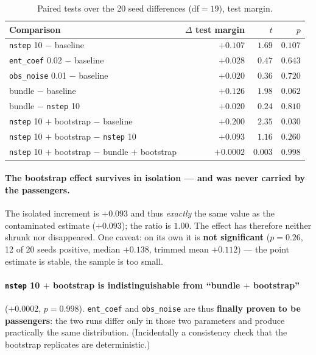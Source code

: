 \begin{table}[H]
  \centering
  \caption{Paired tests over the 20 seed differences (df$=19$), test margin.}
  \label{tab:update-a3c-paired}
  \small
  \begin{tabular}{lrrr}
    \toprule
    Comparison & $\Delta$ test margin & $t$ & $p$\\
    \midrule
    \texttt{nstep} 10 $-$ baseline            & $+0.107$ & $1.69$ & $0.107$\\
    \texttt{ent\_coef} 0.02 $-$ baseline      & $+0.028$ & $0.47$ & $0.643$\\
    \texttt{obs\_noise} 0.01 $-$ baseline     & $+0.020$ & $0.36$ & $0.720$\\
    bundle $-$ baseline                       & $+0.126$ & $1.98$ & $0.062$\\
    bundle $-$ \texttt{nstep} 10              & $+0.020$ & $0.24$ & $0.810$\\
    \texttt{nstep} 10 $+$ bootstrap $-$ baseline & $+0.200$ & $2.35$ & $\mathbf{0.030}$\\
    \texttt{nstep} 10 $+$ bootstrap $-$ \texttt{nstep} 10 & $+0.093$ & $1.16$ & $0.260$\\
    \texttt{nstep} 10 $+$ bootstrap $-$ bundle $+$ bootstrap & $+0.0002$ & $0.003$ & $0.998$\\
    \bottomrule
  \end{tabular}
\end{table}

\paragraph{The bootstrap effect survives in isolation --- and was never carried by the
passengers.} The isolated increment is $+0.093$ and thus \emph{exactly} the same value as
the contaminated estimate ($+0.093$); the ratio is $1.00$. The effect has therefore neither
shrunk nor disappeared. One caveat: on its own it is \textbf{not significant} ($p=0.26$,
12 of 20 seeds positive, median $+0.138$, trimmed mean $+0.112$) --- the point estimate is
stable, the sample is too small.

\paragraph{\texttt{nstep} 10 $+$ bootstrap is indistinguishable from ``bundle $+$
bootstrap''} ($+0.0002$, $p=0.998$). \texttt{ent\_coef} and \texttt{obs\_noise} are thus
\textbf{finally proven to be passengers}: the two runs differ only in those two parameters
and produce practically the same distribution. (Incidentally a consistency check that the
bootstrap replicates are deterministic.)

